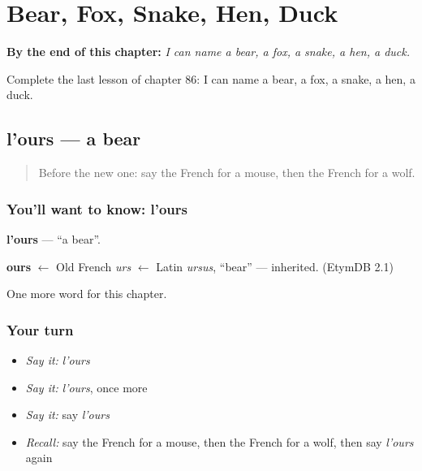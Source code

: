 
\chapter{Bear, Fox, Snake, Hen, Duck}
\label{ch:fr-bear-fox-snake-hen-duck}

\begin{chapteropening}
\textbf{By the end of this chapter:} \emph{I can name a bear, a fox, a snake, a hen, a duck.}

Complete the last lesson of chapter 86: I can name a bear, a fox, a snake, a hen, a duck.
\end{chapteropening}

\section[l'ours]{l'ours — a bear}

\label{lesson:FR-C86-ours}



\begin{quote}
Before the new one: say the French for a mouse, then the French for a wolf.
\end{quote}

\subsection*{You'll want to know: l'ours}
\textbf{l'ours} — \textquotedblleft{}a bear\textquotedblright{}.

\begin{cousinweb}
\textbf{ours} $\leftarrow$ Old French \emph{urs} $\leftarrow$ Latin \emph{ursus}, \textquotedblleft{}bear\textquotedblright{} — inherited. (EtymDB 2.1)
\end{cousinweb}

\begin{grammarlens}[title={What you've built}]
One more word for this chapter.
\end{grammarlens}

\subsection*{Your turn}
\begin{itemize}
\raggedright
  \item \emph{Say it:} \emph{l'ours}
  \item \emph{Say it:} \emph{l'ours}, once more
  \item \emph{Say it:} say \emph{l'ours}
  \item \emph{Recall:} say the French for a mouse, then the French for a wolf, then say \emph{l'ours} again
\end{itemize}

